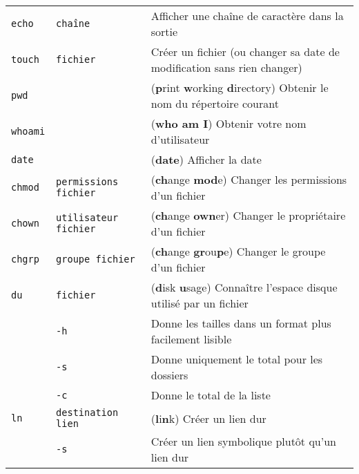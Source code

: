 \documentclass [a4paper]{article}
\begin{document}
\noindent
\begin{tabular}{ lll }
\hline
{\verb+echo+}   & \verb+chaîne+                     & Afficher une chaîne de caractère dans la sortie \\
{\verb+touch+}  & \verb+fichier+                    & Créer un fichier (ou changer sa date de modification sans rien changer) \\
{\verb+pwd+}    &                                   & (\textbf{p}rint \textbf{w}orking \textbf{d}irectory) Obtenir le nom du répertoire courant \\
{\verb+whoami+} &                                   & (\textbf{who am I}) Obtenir votre nom d'utilisateur \\
{\verb+date+}   &                                   & (\textbf{date}) Afficher la date \\
{\verb+chmod+}  & \verb+permissions fichier+        & (\textbf{ch}ange \textbf{mod}e) Changer les permissions d'un fichier \\
{\verb+chown+}  & \verb+utilisateur fichier+        & (\textbf{ch}ange \textbf{own}er) Changer le propriétaire d'un fichier \\
{\verb+chgrp+}  & \verb+groupe fichier+             & (\textbf{ch}ange \textbf{gr}ou\textbf{p}e) Changer le groupe d'un fichier \\
{\verb+du+}     & \verb+fichier+                    & (\textbf{d}isk \textbf{u}sage) Connaître l'espace disque utilisé par un fichier \\
                & \hspace{-0.6cm}\verb+-h+                         & \hspace{0.4cm} Donne les tailles dans un format plus facilement lisible \\
                & \hspace{-0.6cm}\verb+-s+                         & \hspace{0.4cm} Donne uniquement le total pour les dossiers\\
                & \hspace{-0.6cm}\verb+-c+                         & \hspace{0.4cm} Donne le total de la liste\\
{\verb+ln+}     & \verb+destination lien+           & (\textbf{l}i\textbf{n}k) Créer un lien dur \\
                & \hspace{-0.6cm}\verb+-s+                         & \hspace{0.4cm} Créer un lien symbolique plutôt qu'un lien dur \\
\hline
\end{tabular}
\end{document}
